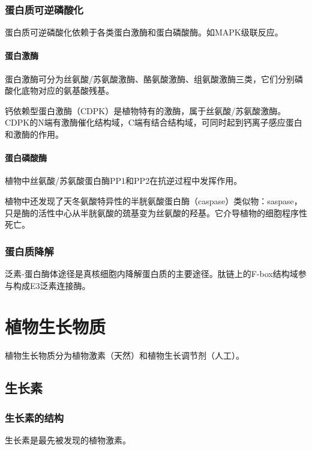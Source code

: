 \subsubsection{蛋白质可逆磷酸化}

蛋白质可逆磷酸化依赖于各类蛋白激酶和蛋白磷酸酶。如MAPK级联反应。

\paragraph{蛋白激酶}

蛋白激酶可分为丝氨酸/苏氨酸激酶、酪氨酸激酶、组氨酸激酶三类，它们分别磷酸化底物对应的氨基酸残基。

钙依赖型蛋白激酶（CDPK）是植物特有的激酶，属于丝氨酸/苏氨酸激酶。CDPK的N端有激酶催化结构域，C端有结合结构域，可同时起到钙离子感应蛋白和激酶的作用。

\paragraph{蛋白磷酸酶}

植物中丝氨酸/苏氨酸蛋白酶PP1和PP2在抗逆过程中发挥作用。

植物中还发现了天冬氨酸特异性的半胱氨酸蛋白酶（caspase）类似物：saspase，只是酶的活性中心从半胱氨酸的巯基变为丝氨酸的羟基。它介导植物的细胞程序性死亡。

\subsubsection{蛋白质降解}

泛素-蛋白酶体途径是真核细胞内降解蛋白质的主要途径。肽链上的F-box结构域参与构成E3泛素连接酶。

\section{植物生长物质}

植物生长物质分为植物激素（天然）和植物生长调节剂（人工）。

\subsection{生长素}

\subsubsection{生长素的结构}

生长素是最先被发现的植物激素。

